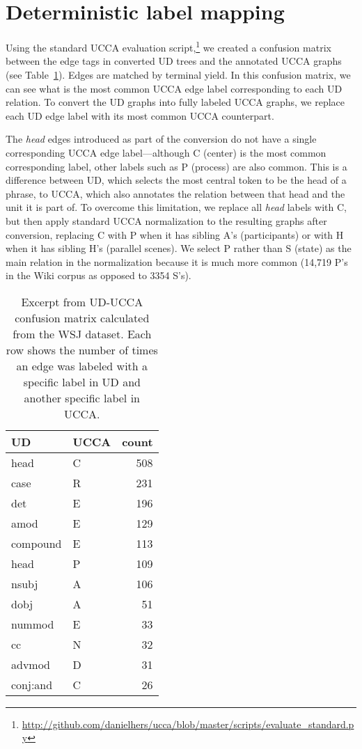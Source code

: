 \documentclass[11pt,a4paper]{article}
\begin{document}
\section{Deterministic label mapping}\label{sec:mapping}


Using the standard UCCA evaluation
script,\footnote{\url{http://github.com/danielhers/ucca/blob/master/scripts/evaluate_standard.py}}
we created a confusion matrix between the edge tags in converted UD trees
and the annotated UCCA graphs (see Table~\ref{tab:confusion_matrix}).
Edges are matched by terminal yield.
In this confusion matrix, we can see what is the most common UCCA edge label corresponding
to each UD relation.
To convert the UD graphs into fully labeled UCCA graphs,
we replace each UD edge label with its most common UCCA counterpart.

The \textit{head} edges introduced as part of the conversion do not have a single
corresponding UCCA edge label---although C (center) is the most common corresponding label,
other labels such as P (process) are also common.
This is a difference between UD, which selects the most central token to be the head of a phrase,
to UCCA, which also annotates the relation between that head and the unit it is part of.
To overcome this limitation, we replace all \textit{head} labels with C, but then
apply standard UCCA normalization to the resulting graphs after conversion,
replacing C with P when it has sibling A's (participants) or
with H when it has sibling H's (parallel scenes).
We select P rather than S (state) as the main relation in the normalization because
it is much more common (14,719 P's in the Wiki corpus as opposed to 3354 S's).

\begin{table}[t]
\centering
\begin{tabular}{ll|r}
UD & UCCA & count \\
\hline
head & C & 508 \\
case & R & 231 \\
det & E & 196 \\ 
amod & E & 129 \\
compound & E & 113 \\
head & P & 109 \\
nsubj & A & 106 \\
dobj & A & 51 \\
nummod & E & 33 \\
cc & N & 32 \\
advmod & D & 31 \\
conj:and & C & 26
\end{tabular}
\caption{Excerpt from UD-UCCA confusion matrix calculated from the WSJ dataset.
Each row shows the number of times an edge was labeled with a specific label in UD
and another specific label in UCCA.\label{tab:confusion_matrix}}
\end{table}
\end{document}
